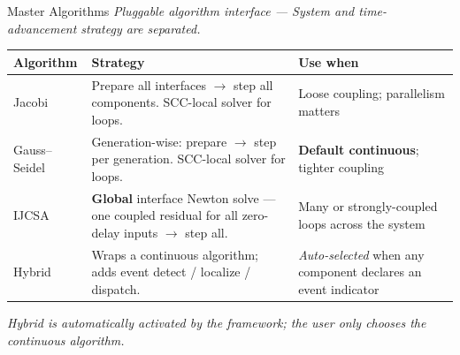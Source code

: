 \begin{frame}{Master Algorithms}
  \centering
  {\small\itshape Pluggable algorithm interface --- System and
   time-advancement strategy are separated.}
  \vspace{0.8em}

  \footnotesize
  \begin{tabular}{
      l
      >{\raggedright\arraybackslash}p{}
      >{\raggedright\arraybackslash}p{}}
    \toprule
    \textbf{Algorithm} & \textbf{Strategy} & \textbf{Use when} \\
    \midrule

    Jacobi &
    Prepare all interfaces $\to$ step all components. \newline
    \ac{SCC}-local solver for loops. &
    Loose coupling; \newline parallelism matters \\
    \addlinespace[3pt]

    Gauss--Seidel &
    Generation-wise: prepare $\to$ step per generation. \newline
    \ac{SCC}-local solver for loops. &
    \textbf{Default continuous}; \newline tighter coupling \\
    \addlinespace[3pt]

    \ac{IJCSA} &
    \textbf{Global} interface Newton solve --- one coupled residual
    for all zero-delay inputs $\to$ step all. &
    Many or strongly-coupled loops across the system \\
    \midrule

    Hybrid &
    Wraps a continuous algorithm; adds event detect / localize /
    dispatch. &
    \emph{Auto-selected} when any component declares an event indicator \\
    \bottomrule
  \end{tabular}

  \vspace{1em}
  \footnotesize
  \emph{Hybrid is automatically activated by the framework;
        the user only chooses the continuous algorithm.}
\end{frame}
